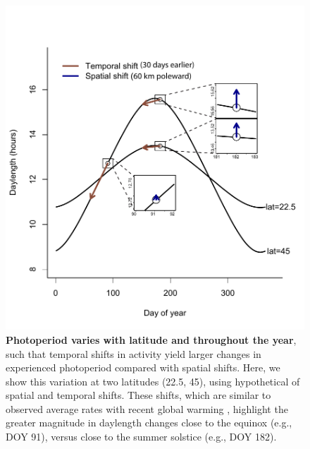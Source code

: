 \documentclass{article}
\begin{document}
\begin{figure}[p]
\centering
\includegraphics{..//..//analyses/photoperiod/figures/photo_spacetime_v2.pdf} %
\caption{\textbf{Photoperiod varies with latitude and throughout the year}, such that temporal shifts in activity yield larger changes in experienced photoperiod compared with spatial shifts. Here, we show this variation at two latitudes (22.5\degree, 45\degree), using hypothetical of spatial and temporal shifts. These shifts, which are similar to observed average rates with recent global warming \citep[e.g.,][]{parmesan2006,chen2011}, highlight the greater magnitude in daylength changes close to the equinox (e.g., DOY 91), versus close to the summer solstice (e.g., DOY 182).}
 \label{fig:spacetime}%
 \end{figure}
 
\end{document}
